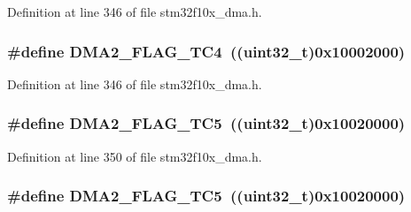 Definition at line 346 of file stm32f10x\+\_\+dma.\+h.

\subsubsection[{\texorpdfstring{D\+M\+A2\+\_\+\+F\+L\+A\+G\+\_\+\+T\+C4}{DMA2_FLAG_TC4}}]{\setlength{\rightskip}{0pt plus 5cm}\#define D\+M\+A2\+\_\+\+F\+L\+A\+G\+\_\+\+T\+C4~(({\bf uint32\+\_\+t})0x10002000)}\hypertarget{group___d_m_a__flags__definition_gad4f76b7a22233dbb9daaad448c431165}{}\label{group___d_m_a__flags__definition_gad4f76b7a22233dbb9daaad448c431165}


Definition at line 346 of file stm32f10x\+\_\+dma.\+h.

\subsubsection[{\texorpdfstring{D\+M\+A2\+\_\+\+F\+L\+A\+G\+\_\+\+T\+C5}{DMA2_FLAG_TC5}}]{\setlength{\rightskip}{0pt plus 5cm}\#define D\+M\+A2\+\_\+\+F\+L\+A\+G\+\_\+\+T\+C5~(({\bf uint32\+\_\+t})0x10020000)}\hypertarget{group___d_m_a__flags__definition_ga5ba4dce652a1a29bedbd7d8dc35ca4ec}{}\label{group___d_m_a__flags__definition_ga5ba4dce652a1a29bedbd7d8dc35ca4ec}


Definition at line 350 of file stm32f10x\+\_\+dma.\+h.

\subsubsection[{\texorpdfstring{D\+M\+A2\+\_\+\+F\+L\+A\+G\+\_\+\+T\+C5}{DMA2_FLAG_TC5}}]{\setlength{\rightskip}{0pt plus 5cm}\#define D\+M\+A2\+\_\+\+F\+L\+A\+G\+\_\+\+T\+C5~(({\bf uint32\+\_\+t})0x10020000)}\hypertarget{group___d_m_a__flags__definition_ga5ba4dce652a1a29bedbd7d8dc35ca4ec}{}\label{group___d_m_a__flags__definition_ga5ba4dce652a1a29bedbd7d8dc35ca4ec}


